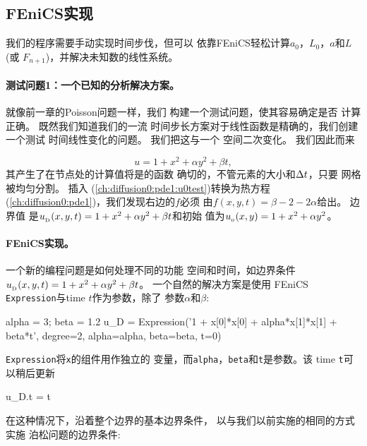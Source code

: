 \subsection{FEniCS实现}
\label{ftut:timedep:diffusion1:impl}

我们的程序需要手动实现时间步伐，但可以
依靠FEniCS轻松计算$a_0$，$L_0$，$a$和$L$(或
$F_{n+1}$)，并解决未知数的线性系统。

\paragraph{测试问题1：一个已知的分析解决方案。}
就像前一章的Poisson问题一样，我们
构建一个测试问题，使其容易确定是否
计算正确。 既然我们知道我们的一流
时间步长方案对于线性函数是精确的，我们创建一个测试
时间线性变化的问题。 我们把这与一个
空间二次变化。 我们因此而来

\begin{equation} u = 1 + x^2 + \alpha y^2 + \beta t,
\label{ch:diffusion0:pde1:u0test}
\end{equation}
其产生了在节点处的计算值将是的函数
确切的，不管元素的大小和$\Delta t$，只要
网格被均匀分割。 插入
(\ref{ch:diffusion0:pde1:u0test})转换为热方程
(\ref{ch:diffusion0:pde1})，我们发现右边的$f$必须
由$f(x,y,t)=\beta - 2 - 2\alpha$给出。 边界值
是$u_{_\mathrm{D}}(x,y,t)= 1 + x^2 + \alpha y^2 + \beta t$和初始
值为$u_{_0}(x,y)= 1 + x^2 + \alpha y^2$。

\paragraph{FEniCS实现。}
一个新的编程问题是如何处理不同的功能
空间和时间，如边界条件$u_{_\mathrm{D}}(x,y,
t)= 1 + x^2 + \alpha y^2 + \beta t$。 一个自然的解决方案是使用
FEniCS \texttt{Expression}与time $t$作为参数，除了
参数$\alpha$和$\beta$:


\begin{python}
alpha = 3; beta = 1.2
u_D = Expression('1 + x[0]*x[0] + alpha*x[1]*x[1] + beta*t',
                 degree=2, alpha=alpha, beta=beta, t=0)
\end{python}
\texttt{Expression}将\texttt{x}的组件用作独立的
变量，而\texttt{alpha}，\texttt{beta}和\texttt{t}是参数。该
time \texttt{t}可以稍后更新

\begin{python}
u_D.t = t
\end{python}

在这种情况下，沿着整个边界的基本边界条件，
以与我们以前实施的相同的方式实施
泊松问题的边界条件:

